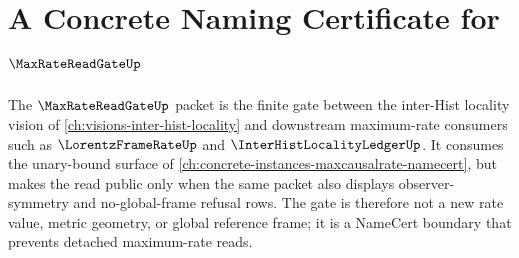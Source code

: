 \chapter{A Concrete Naming Certificate for $\MaxRateReadGateUp$}
\label{ch:concrete-instances-maxratereadgate-namecert}

The $\MaxRateReadGateUp$ packet is the finite gate between the inter-Hist locality vision of \autoref{ch:visions-inter-hist-locality} and downstream maximum-rate consumers such as $\LorentzFrameRateUp$ and $\InterHistLocalityLedgerUp$. It consumes the unary-bound surface of \autoref{ch:concrete-instances-maxcausalrate-namecert}, but makes the read public only when the same packet also displays observer-symmetry and no-global-frame refusal rows. The gate is therefore not a new rate value, metric geometry, or global reference frame; it is a NameCert boundary that prevents detached maximum-rate reads.



